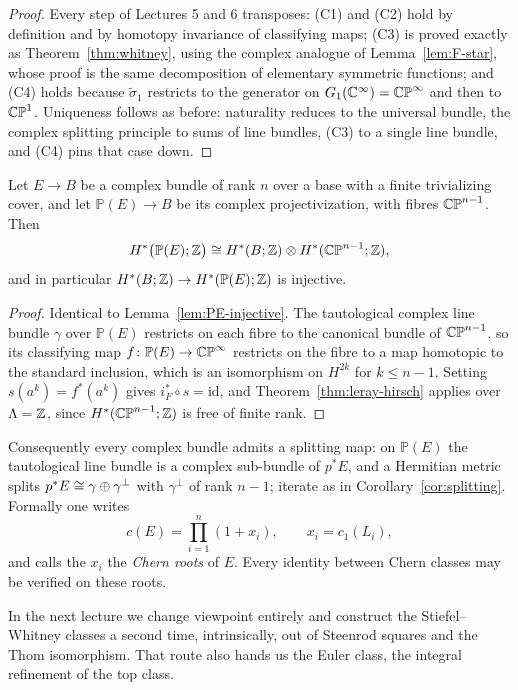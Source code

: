 \begin{proof}
Every step of Lectures 5 and 6 transposes: (C1) and (C2) hold by definition and
by homotopy invariance of classifying maps; (C3) is proved exactly as
Theorem~\ref{thm:whitney}, using the complex analogue of
Lemma~\ref{lem:F-star}, whose proof is the same decomposition of elementary
symmetric functions; and (C4) holds because $\tilde\sigma_1$ restricts to the
generator on $G_1(\mathbb{C}^\infty)=\mathbb{CP}^\infty$ and then to $\mathbb{CP}^1$. Uniqueness follows
as before: naturality reduces to the universal bundle, the complex splitting
principle to sums of line bundles, (C3) to a single line bundle, and (C4) pins
that case down.
\end{proof}

\begin{lemma}\label{lem:pi-star-injective}
Let $E\to B$ be a complex bundle of rank $n$ over a base with a finite
trivializing cover, and let $\mathbb P(E)\to B$ be its complex projectivization,
with fibres $\mathbb{CP}^{n-1}$. Then
\[
H^*\big(\mathbb P(E);\mathbb{Z}\big)\cong H^*(B;\mathbb{Z})\otimes H^*(\mathbb{CP}^{n-1};\mathbb{Z}),
\]
and in particular $H^*(B;\mathbb{Z})\to H^*(\mathbb P(E);\mathbb{Z})$ is injective.
\end{lemma}

\begin{proof}
Identical to Lemma~\ref{lem:PE-injective}. The tautological complex line bundle
$\gamma$ over $\mathbb P(E)$ restricts on each fibre to the canonical bundle of
$\mathbb{CP}^{n-1}$, so its classifying map
$f\colon\mathbb P(E)\to\mathbb{CP}^\infty$ restricts on the fibre to a map homotopic to
the standard inclusion, which is an isomorphism on $H^{2k}$ for $k\le n-1$.
Setting $s(a^k)=f^*(a^k)$ gives $i_F^*\circ s=\mathrm{id}$, and
Theorem~\ref{thm:leray-hirsch} applies over $\Lambda=\mathbb{Z}$, since
$H^*(\mathbb{CP}^{n-1};\mathbb{Z})$ is free of finite rank.
\end{proof}

\begin{remark}\label{rem:complex-splitting}
Consequently every complex bundle admits a splitting map: on $\mathbb P(E)$ the
tautological line bundle is a complex sub-bundle of $p^*E$, and a Hermitian
metric splits $p^*E\cong\gamma\oplus\gamma^\perp$ with $\gamma^\perp$ of rank
$n-1$; iterate as in Corollary~\ref{cor:splitting}. Formally one writes
\[
c(E)=\prod_{i=1}^{n}(1+x_i),
\qquad x_i=c_1(L_i),
\]
and calls the $x_i$ the \emph{Chern roots} of $E$. Every identity between Chern
classes may be verified on these roots.
\end{remark}

In the next lecture we change viewpoint entirely and construct the
Stiefel--Whitney classes a second time, intrinsically, out of Steenrod squares
and the Thom isomorphism. That route also hands us the Euler class, the integral
refinement of the top class.
